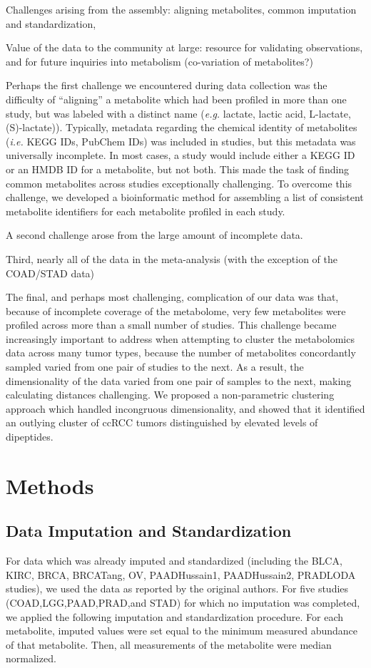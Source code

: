 \documentclass[10pt]{article}
\begin{document}
Challenges arising from the assembly: aligning metabolites, common imputation and standardization, 

Value of the data to the community at large: resource for validating observations, and for future inquiries into metabolism (co-variation of metabolites?)



Perhaps the first challenge we encountered during data collection was the difficulty of ``aligning'' a metabolite which had been profiled in more than one study, but was labeled with a distinct name (\textit{e.g.} lactate, lactic acid, L-lactate, (S)-lactate)). Typically, metadata regarding the chemical identity of metabolites (\textit{i.e.} KEGG IDs, PubChem IDs) was included in studies, but this metadata was universally incomplete. In most cases, a study would include either a KEGG ID or an HMDB ID for a metabolite, but not both. This made the task of finding common metabolites across studies exceptionally challenging. To overcome this challenge, we developed a bioinformatic method for assembling a list of consistent metabolite identifiers for each metabolite profiled in each study.

A second challenge arose from the large amount of incomplete data. 

Third, nearly all of the data in the meta-analysis (with the exception of the COAD/STAD data) 

The final, and perhaps most challenging, complication of our data was that, because of incomplete coverage of the metabolome, very few metabolites were profiled across more than a small number of studies. This challenge became increasingly important to address when attempting to cluster the metabolomics data across many tumor types, because the number of metabolites concordantly sampled varied from one pair of studies to the next. As a result, the dimensionality of the data varied from one pair of samples to the next, making calculating distances challenging. We proposed a non-parametric clustering approach which handled incongruous dimensionality, and showed that it identified an outlying cluster of ccRCC tumors distinguished by elevated levels of dipeptides.


\section{Methods}

\subsection{Data Imputation and Standardization}
For data which was already imputed and standardized (including the BLCA, KIRC, BRCA, BRCATang, OV, PAADHussain1, PAADHussain2, PRADLODA studies), we used the data as reported by the original authors. For five studies (COAD,LGG,PAAD,PRAD,and STAD) for which no imputation was completed, we applied the following imputation and standardization procedure. For each metabolite, imputed values were set equal to the minimum measured abundance of that metabolite. Then, all measurements of the metabolite were median normalized. 
\end{document}
